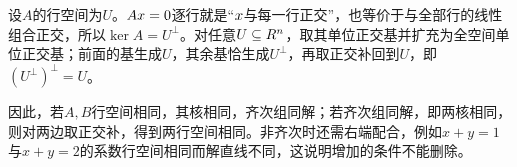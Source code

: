 \label{der:4-3}
设$A$的行空间为$U$。$Ax=0$逐行就是“$x$与每一行正交”，也等价于与全部行的线性组合正交，所以$\ker A=U^\perp$。对任意$U\subseteq R^n$，取其单位正交基并扩充为全空间单位正交基；前面的基生成$U$，其余基恰生成$U^\perp$，再取正交补回到$U$，即$(U^\perp)^\perp=U$。

因此，若$A,B$行空间相同，其核相同，齐次组同解；若齐次组同解，即两核相同，则对两边取正交补，得到两行空间相同。非齐次时还需右端配合，例如$x+y=1$与$x+y=2$的系数行空间相同而解直线不同，这说明增加的条件不能删除。
